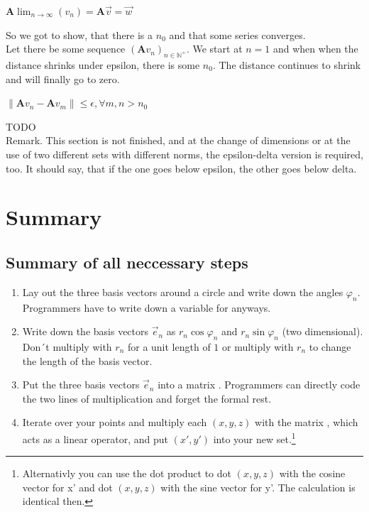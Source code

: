 \documentclass[a4paper]{article}
\begin{document}
\begin{center}
$\boldsymbol{A}\lim_{n\rightarrow\infty} (v_{n}) = \boldsymbol{A}\vec{v} = \vec{w}$
\end{center}

So we got to show, that there is a $n_{0}$ and that some series converges.\\

Let there be some sequence $(\boldsymbol{A}v_{n})_{n\in\mathbb{N}^{+}}$.
We start at $n=1$ and when   when the distance shrinks under epsilon, there is some $n_{0}$. The distance continues to shrink and will finally go to zero.

\begin{center}
$\|\boldsymbol{A}v_{n} - \boldsymbol{A}v_{m}\| \leq \epsilon,  \forall m,n > n_{0}$
\end{center}

TODO\\

Remark. This section is not finished, and at the change of dimensions or at the use of two different sets with different norms, the epsilon-delta version is required, too. It should say, that if the one goes below epsilon, the other goes below delta.\\




\section{Summary}

\subsection{Summary of all neccessary steps}
\begin{enumerate}
\item Lay out the three basis vectors around a circle and write down the angles $\varphi_{n}$. Programmers have to write down a variable for anyways.
\item Write down the basis vectors $\vec{e}_{n}$ as $r_{n} \cos \varphi_{n}$ and $r_{n} \sin \varphi_{n}$ (two dimensional). Don´t multiply with $r_{n}$ for a unit length of $1$ or multiply with $r_{n}$ to change the length of the basis vector.
\item Put the three basis vectors $\vec{e}_{n}$ into a matrix . Programmers can directly code the two lines of multiplication and forget the formal rest.
\item Iterate over your points and multiply each $(x,y,z)$ with the matrix , which acts as a linear operator, and put $(x',y')$ into your new set.\footnote{Alternativly you can use the dot product to dot $(x,y,z)$ with the cosine vector for x' and dot $(x,y,z)$ with the sine vector for y'. The calculation is identical then.}
\end{enumerate}
\end{document}

